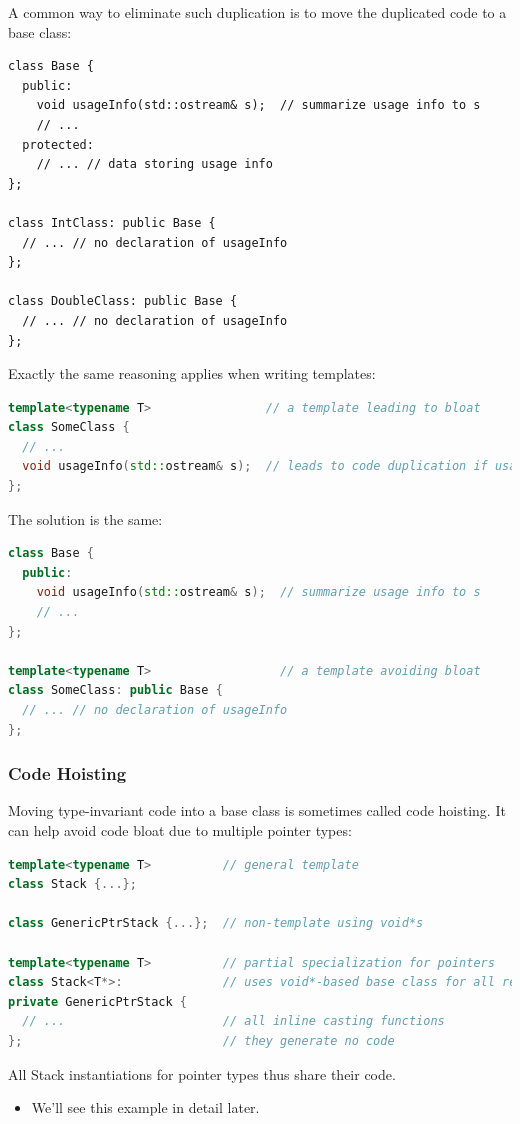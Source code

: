A common way to eliminate such duplication is to move the duplicated code to a base class:
\begin{lstlisting}[lanugage=C++]
class Base {
  public:
    void usageInfo(std::ostream& s);  // summarize usage info to s
    // ...
  protected:
    // ... // data storing usage info
};

class IntClass: public Base {
  // ... // no declaration of usageInfo
};

class DoubleClass: public Base {
  // ... // no declaration of usageInfo
};
\end{lstlisting}

Exactly the same reasoning applies when writing templates:
\begin{lstlisting}[language=C++]
template<typename T>                // a template leading to bloat
class SomeClass {
  // ...
  void usageInfo(std::ostream& s);  // leads to code duplication if usageInfo makes no use of T
};
\end{lstlisting}
The solution is the same:
\begin{lstlisting}[language=C++]
class Base {
  public:
    void usageInfo(std::ostream& s);  // summarize usage info to s
    // ...
};

template<typename T>                  // a template avoiding bloat
class SomeClass: public Base {
  // ... // no declaration of usageInfo
};
\end{lstlisting}

\subsubsection{Code Hoisting}
Moving type-invariant code into a base class is sometimes called code hoisting. It can help avoid code bloat due to multiple pointer types:
\begin{lstlisting}[language=C++]
template<typename T>          // general template
class Stack {...};

class GenericPtrStack {...};  // non-template using void*s

template<typename T>          // partial specialization for pointers
class Stack<T*>:              // uses void*-based base class for all real work
private GenericPtrStack {
  // ...                      // all inline casting functions
};                            // they generate no code
\end{lstlisting}
All Stack instantiations for pointer types thus share their code.
\begin{itemize}
  \item We'll see this example in detail later.
\end{itemize}

